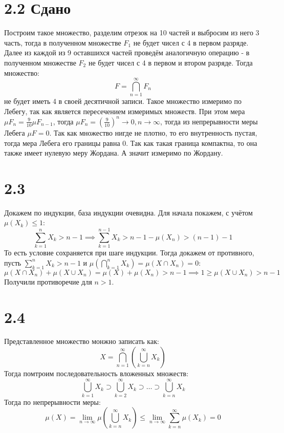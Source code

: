 \documentclass[12pt]{article}
\begin{document}
\section{2.2 Сдано}
Построим такое множество, разделим отрезок на 10 частей и выбросим из него 3 часть, тогда в полученном 
множестве $F_1$ не будет чисел с 4 в первом разряде. Далее из каждой из 9 оставшихся частей проведём аналогичную операцию - 
в полученном множестве $F_2$ не будет чисел с 4 в первом и втором разряде. Тогда множество:
\[
    F = \bigcap_{n=1}^{\infty} F_n
\]  
не будет иметь 4 в своей десятичной записи. Такое множество измеримо по Лебегу, так как является 
пересечением измеримых множеств. При этом мера $\mu F_n = \frac{9}{10} \mu F_{n-1}$, тогда 
$\mu F_n = \left( \frac{9}{10} \right)^n \to 0, n \to \infty$, тогда из непрерывности меры Лебега 
$\mu F = 0$. Так как множество нигде не плотно, то его внутренность пустая, тогда мера Лебега его 
границы равна $0$. Так как такая граница компактна, то она также имеет нулевую меру Жордана. А значит измеримо по 
Жордану. 
\section{2.3}
Докажем по индукции, база индукции очевидна. Для начала покажем, с учётом $\mu(X_k) \leq 1$: 
\[
    \sum_{k=1}^{n} X_k > n - 1 \implies \sum_{k=1}^{n - 1} X_k > n - 1 - \mu(X_n) > (n - 1) - 1
\]
То есть условие сохраняется при шаге индукции. Тогда докажем от противного, пусть $\sum_{k=1}^{n} X_k > n - 1$
и $\mu \left( \bigcap_{k=1}^{n} X_k \right)  = \mu (X \cap X_n) = 0$: 
\[
    \mu(X \cap X_n) + \mu(X \cup X_n) = \mu(X) + \mu(X_n) > n - 1 \implies 1 \geq \mu(X \cup X_n) > n - 1  
\]     
Получили противоречие для $n > 1$. 
\section{2.4}
Представленное множество монжно записать как:
\[
    X = \bigcap_{n=1}^{\infty} \left( \bigcup_{k=n}^{\infty} X_k \right) 
\] 
Тогда помтроим последовательность вложенных множеств: 
\[
    \bigcup_{k=1}^{\infty} X_k \supset \bigcup_{k=2}^{\infty} X_k \supset \dots \supset \bigcup_{k=n}^{\infty} X_k
\]
Тогда по непрерывности меры: 
\[
    \mu(X) = \lim_{n \to \infty} \mu \left( \bigcup_{k=n}^{\infty} X_k \right) \leq \lim_{n \to \infty} \sum_{k=n}^{\infty} \mu(X_k) = 0
\]
\end{document}

